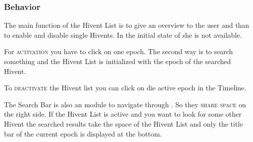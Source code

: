 \subsubsection{Behavior} %
\label{ssub:behaviour_hl}
The main function of the Hivent List is to give an overview to the user and than to enable and disable single Hivents. In the initial state of she is not available. 

For \textsc{activation} you have to click on one epoch. The second way is to search something and the Hivent List is initialized with the epoch of the searched Hivent.

To \textsc{deactivate} the Hivent list you can click on die active epoch in the Timeline.

The Search Bar is also an module to navigate through \HG. So they \textsc{share space} on the right side. If the Hivent List is active and you want to look for some other Hivent the searched results take the space of the Hivent List and only the title bar of the current epoch is displayed at the bottom.

